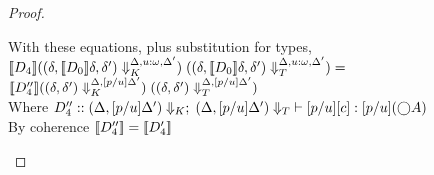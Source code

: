\begin{proof}
\begin{enumerate}
\begin{itemize}
\begin{tabbedproof}
      \ooooo With these equations, plus substitution for types, \\
      \oooooo $\interp{D_4}(\restricttyenv{\Delta, u:\omega, \Delta'}
                                          {(\delta, \interp{D_0}\delta, \delta')})\;
                                       (\restrictvals{\Delta, u:\omega, \Delta'}
                                                     {(\delta, \interp{D_0}\delta, \delta')}) =$\\
      \ooooox $\interp{D''_4}(\restricttyenv{\Delta, [p/u]\Delta'}{(\delta, \delta')})\;
                          (\restrictvals{\Delta, [p/u]\Delta'}{(\delta, \delta')})$ \\
      \ooooo Where $D''_4 :: \judgeE[\restrictkind{\Delta,[p/u]\Delta'}]
                         {\restricttype{\Delta,[p/u]\Delta'}}{[p/u]\comp{c}}{[p/u](\monad{A})}$\\
      \ooooo By coherence $\interp{D''_4} = \interp{D'_4}$ \\


\end{tabbedproof}
\end{itemize}
\end{enumerate}
\end{proof}
